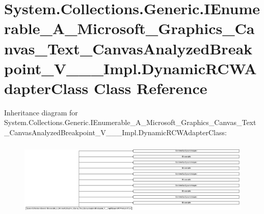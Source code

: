 \hypertarget{class_system_1_1_collections_1_1_generic_1_1_i_enumerable___a___microsoft___graphics___canvas___52aaec9e403dada8f8f68e9ec4b35c0f}{}\section{System.\+Collections.\+Generic.\+I\+Enumerable\+\_\+\+A\+\_\+\+Microsoft\+\_\+\+Graphics\+\_\+\+Canvas\+\_\+\+Text\+\_\+\+Canvas\+Analyzed\+Breakpoint\+\_\+\+V\+\_\+\+\_\+\+\_\+\+Impl.\+Dynamic\+R\+C\+W\+Adapter\+Class Class Reference}
\label{class_system_1_1_collections_1_1_generic_1_1_i_enumerable___a___microsoft___graphics___canvas___52aaec9e403dada8f8f68e9ec4b35c0f}
Inheritance diagram for System.\+Collections.\+Generic.\+I\+Enumerable\+\_\+\+A\+\_\+\+Microsoft\+\_\+\+Graphics\+\_\+\+Canvas\+\_\+\+Text\+\_\+\+Canvas\+Analyzed\+Breakpoint\+\_\+\+V\+\_\+\+\_\+\+\_\+\+Impl.\+Dynamic\+R\+C\+W\+Adapter\+Class\+:\begin{figure}[H]
\begin{center}
\leavevmode
\includegraphics[height=3.657958cm]{class_system_1_1_collections_1_1_generic_1_1_i_enumerable___a___microsoft___graphics___canvas___52aaec9e403dada8f8f68e9ec4b35c0f}
\end{center}
\end{figure}
